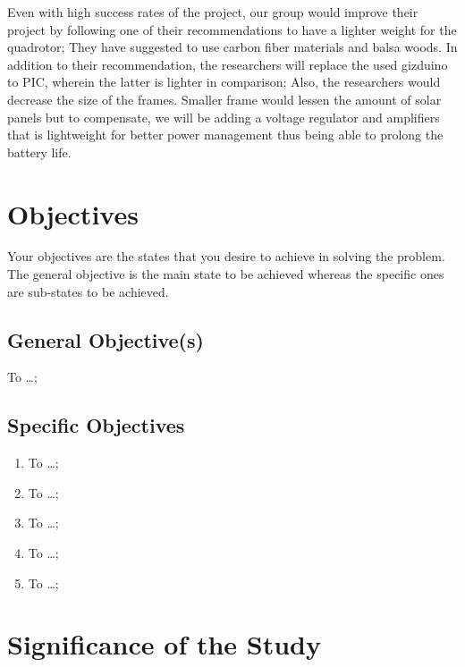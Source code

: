 Even with high success rates of the project, our group would improve their project by following one of their recommendations to have a lighter weight for the quadrotor; They have suggested to use carbon fiber materials and balsa woods. In addition to their recommendation, the researchers  will replace the used gizduino to PIC, wherein the latter is lighter in comparison; Also, the researchers would decrease the size of the frames. Smaller frame would lessen the amount of solar panels but to compensate, we will be adding a voltage regulator and amplifiers that is lightweight for better power management thus being able to prolong the battery life.



\graytx{\blindtext}



\section{Objectives}

Your objectives are the states that you desire to achieve in solving the problem. The general objective is the main state to be achieved whereas the specific ones are sub-states to be achieved.

\subsection{General Objective(s)}
To \ldots;

\subsection{Specific Objectives}

\begin{enumerate}
	\item To  \ldots;

	\item To  \ldots;

	\item To  \ldots;

	\item To  \ldots;

	\item To  \ldots;
\end{enumerate}



\section{Significance of the Study}

